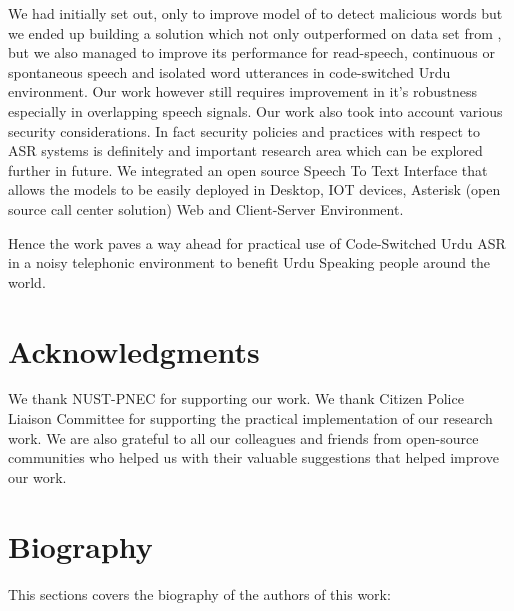 \documentclass{article}
\begin{document}
We had initially set out, only to improve model of \cite{sehar_gul_detecting_2020} to detect malicious words but we ended up building a solution which not only outperformed on data set from \cite{sehar_gul_detecting_2020,ali_automatic_2015,qureshi_urdu_2021}, but we also managed to improve its performance for read-speech, continuous or spontaneous speech and isolated word utterances in code-switched Urdu environment. Our work however still requires improvement in it's robustness especially in overlapping speech signals. Our work also took into account various security considerations. In fact security policies and practices with respect to ASR systems is definitely and important research area which can be explored further in future. We integrated an open source Speech To Text Interface that allows the models to be easily deployed in Desktop, IOT devices, Asterisk (open source call center solution) Web and Client-Server Environment. 

Hence the work paves a way ahead for practical use of Code-Switched Urdu ASR in a noisy telephonic environment to benefit Urdu Speaking people around the world.

\section{Acknowledgments}
We thank NUST-PNEC for supporting our work. We thank Citizen Police Liaison Committee for supporting the practical implementation of our research work. We are also grateful to all our colleagues and friends from open-source communities who helped us with their valuable suggestions that helped improve our work.



\newpage

\section*{Biography}
This sections covers the biography of the authors of this work:
 
\end{document}
